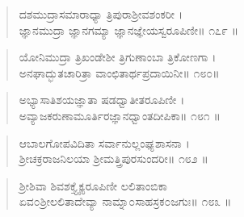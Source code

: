 \begin{verse}
ದಶಮುದ್ರಾಸಮಾರಾಧ್ಯಾ ತ್ರಿಪುರಾಶ್ರೀವಶಂಕರೀ ।\\ಜ್ಞಾನಮುದ್ರಾ ಜ್ಞಾನಗಮ್ಯಾ  ಜ್ಞಾನಜ್ಞೇಯಸ್ವರೂಪಿಣೀ\num{॥ ೧೭೯ ॥}
\end{verse}

\begin{verse}
ಯೋನಿಮುದ್ರಾ ತ್ರಿಖಂಡೇಶೀ ತ್ರಿಗುಣಾಂಬಾ ತ್ರಿಕೋಣಗಾ ।\\ಅನಘಾದ್ಭುತಚಾರಿತ್ರಾ ವಾಂಛಿತಾರ್ಥಪ್ರದಾಯಿನೀ\num{॥ ೧೮೦॥}
\end{verse}

\begin{verse}
ಅಭ್ಯಾಸಾತಿಶಯಜ್ಞಾತಾ  ಷಡಧ್ವಾತೀತರೂಪಿಣೀ ।\\ಅವ್ಯಾಜಕರುಣಾಮೂರ್ತಿರಜ್ಞಾನಧ್ವಾಂತದೀಪಿಕಾ\num{॥ ೧೮೧ ॥}
\end{verse}

\begin{verse}
ಆಬಾಲಗೋಪವಿದಿತಾ ಸರ್ವಾನುಲ್ಲಂಘ್ಯಶಾಸನಾ ।\\ಶ್ರೀಚಕ್ರರಾಜನಿಲಯಾ ಶ್ರೀಮತ್ತ್ರಿಪುರಸುಂದರೀ\num{॥ ೧೮೨ ॥}
\end{verse}

\begin{verse}
ಶ್ರೀಶಿವಾ ಶಿವಶಕ್ತ್ಯೈಕ್ಯರೂಪಿಣೀ ಲಲಿತಾಂಬಿಕಾ \\ಏವ೦ಶ್ರೀಲಲಿತಾದೇವ್ಯಾ ನಾಮ್ನಾ೦ಸಾಹಸ್ರಕ೦ಜಗುಃ\num{॥ ೧೮೩ ॥}
\end{verse}

